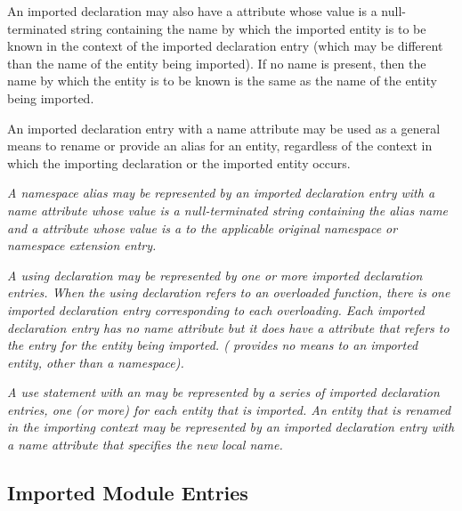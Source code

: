 An imported declaration may also have a \DWATname{}
attribute
whose value is a null-terminated string containing the
name by which the
imported entity is to be known in the context of the imported
declaration entry (which may be different than the name of
the entity being imported). If no name is present, then the
name by which the entity is to be known is the same as the
name of the entity being imported.

An imported declaration entry with a name attribute may be
used as a general means to rename or provide an alias for
an entity, regardless of the context in which the importing
declaration or the imported entity occurs.

\textit{A 
namespace alias\hypertarget{chap:DWATimportnamespacealias}{} 
may be represented by an imported declaration entry 
with a name attribute whose value is
a null-terminated string containing the alias name
and a \DWATimportDEFN{} attribute 
whose value is a  to the 
applicable original namespace or namespace extension entry.}

\textit{A  using declaration may be represented 
by one or more
imported\hypertarget{chap:DWATimportnamespaceusingdeclaration}{} 
declaration entries.  When the using declaration
refers to an overloaded function, there is one imported
declaration entry corresponding to each overloading. Each
imported declaration entry has no name attribute but it does
have a \DWATimportDEFN{} attribute that refers to the entry for the
entity being imported. ( 
provides no means to 
an imported entity, other than a namespace).}


\textit{A  use statement 
with an  may be
represented by a series of imported declaration entries,
one (or more) for each entity that is imported. An entity
that is renamed in the importing context may be represented
by an imported declaration entry with a name attribute that
specifies the new local name.
}

\subsection{Imported Module Entries}
\label{chap:importedmoduleentries}

